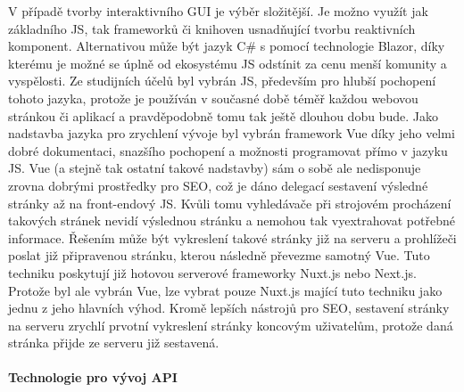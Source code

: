 \begin{itemize}
\begin{itemize}
			V případě tvorby interaktivního \Ac{GUI} je výběr složitější.
			Je možno využít jak základního \ac{JS}, tak frameworků či knihoven usnadňující tvorbu reaktivních komponent.
			Alternativou může být jazyk C\# s pomocí technologie Blazor, díky kterému je možné se úplně od ekosystému
			\ac{JS} odstínit za cenu menší komunity a vyspělosti.
			Ze studijních účelů byl vybrán \ac{JS}, především pro hlubší pochopení tohoto jazyka, protože je používán v současné
			době téměř každou webovou stránkou či aplikací a pravděpodobně tomu tak ještě dlouhou dobu bude.
			Jako nadstavba jazyka pro zrychlení vývoje byl vybrán framework Vue díky jeho velmi dobré dokumentaci, snazšího
			pochopení a možnosti programovat přímo v jazyku \ac{JS}.
			Vue (a stejně tak ostatní takové nadstavby) sám o sobě ale nedisponuje zrovna dobrými prostředky pro \Ac{SEO},
			což je dáno delegací sestavení výsledné stránky až na front-endový \ac{JS}.
			Kvůli tomu vyhledávače při strojovém procházení takových stránek nevidí výslednou stránku a nemohou tak
			vyextrahovat potřebné informace.
			Řešením může být vykreslení takové stránky již na serveru a prohlížeči poslat již připravenou stránku, kterou
			následně převezme samotný Vue.
			Tuto techniku poskytují již hotovou serverové frameworky Nuxt.js nebo Next.js.
			Protože byl ale vybrán Vue, lze vybrat pouze Nuxt.js mající tuto techniku jako jednu z jeho hlavních výhod.
			Kromě lepších nástrojů pro \ac{SEO}, sestavení stránky na serveru zrychlí prvotní vykreslení stránky
			koncovým uživatelům, protože daná stránka přijde ze serveru již sestavená.

			\paragraph{Technologie pro vývoj API}


\end{itemize}
\end{itemize}
